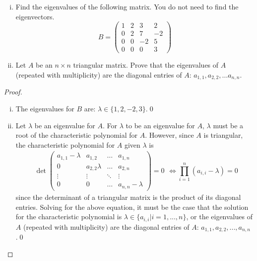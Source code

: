 \begin{question} 
\normalfont 
\begin{enumerate}[(i)]
 
 \item Find the eigenvalues of the following matrix. You do not need to find the eigenvectors.
 \[
 B = \begin{pmatrix}
			1 & 2 & 3 & 2\\
			0 & 2 & 7 & -2\\
			0 & 0 & -2 & 5\\
			0 & 0 & 0 & 3	
		\end{pmatrix}
 \]
 \vspace{.2cm}

\item Let $A$ be an $n\times n$ triangular matrix. Prove that the eigenvalues of $A$ (repeated with multiplicity) are the diagonal entries of $A$: $a_{1,1}, a_{2,2}, \ldots a_{n,n}$. 
	\normalfont		
\end{enumerate}	
	
	\end{question}

\begin{proof}
    \renewcommand{\qedsymbol}{$\blacksquare$}
    \begin{enumerate}[(i)]
        \item The eigenvalues for $B$ are: $\lambda\in\{1, 2, -2, 3\}$.\qed
        \item Let $\lambda$ be an eigenvalue for $A$.
        For $\lambda$ to be an eigenvalue for $A$, $\lambda$ must be a root of the characteristic polynomial for $A$.
        However, since $A$ is triangular, the characteristic polynomial for $A$ given $\lambda$ is 
        \[
            \begin{aligned}
                \det\begin{pmatrix}
                    a_{1,1}-\lambda & a_{1,2} & \dots & a_{1,n}\\
                    0 & a_{2,2}\lambda & \dots & a_{2,n}\\
                    \vdots & \vdots & \ddots & \vdots\\
                    0 & 0 & \dots & a_{n,n}-\lambda
                \end{pmatrix}=0
            \end{aligned}
            \iff
            \prod_{i=1}^{n}(a_{i,i}-\lambda)=0
        \]   
        since the determinant of a triangular matrix is the product of its diagonal entries.
        Solving for the above equation, it must be the case that the solution for the characteristic polynomial is $\lambda\in\{a_{i,i}|i=1,...,n\}$, or the eigenvalues of $A$ (repeated with multiplicity) are the diagonal entries of $A$: $a_{1,1},a_{2,2},...,a_{n,n}$.\qed
    \end{enumerate}
    \renewcommand{\qedsymbol}{}
\end{proof}